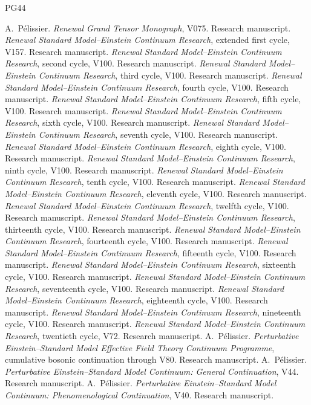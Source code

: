 \documentclass[11pt,a4paper,oneside]{book}
\theoremstyle{plain}
\theoremstyle{definition}
\theoremstyle{remark}
\begin{document}
\backmatter
\begingroup\small
\begin{thebibliography}{PG44}
\setlength{\itemsep}{0pt}
\setlength{\parsep}{0pt}
\setlength{\parskip}{0pt}
 A.\ P\'elissier. \emph{Renewal Grand Tensor Monograph}, V075. Research manuscript.
 \emph{Renewal Standard Model--Einstein Continuum Research}, extended first cycle, V157. Research manuscript.
 \emph{Renewal Standard Model--Einstein Continuum Research}, second cycle, V100. Research manuscript.
 \emph{Renewal Standard Model--Einstein Continuum Research}, third cycle, V100. Research manuscript.
 \emph{Renewal Standard Model--Einstein Continuum Research}, fourth cycle, V100. Research manuscript.
 \emph{Renewal Standard Model--Einstein Continuum Research}, fifth cycle, V100. Research manuscript.
 \emph{Renewal Standard Model--Einstein Continuum Research}, sixth cycle, V100. Research manuscript.
 \emph{Renewal Standard Model--Einstein Continuum Research}, seventh cycle, V100. Research manuscript.
 \emph{Renewal Standard Model--Einstein Continuum Research}, eighth cycle, V100. Research manuscript.
 \emph{Renewal Standard Model--Einstein Continuum Research}, ninth cycle, V100. Research manuscript.
 \emph{Renewal Standard Model--Einstein Continuum Research}, tenth cycle, V100. Research manuscript.
 \emph{Renewal Standard Model--Einstein Continuum Research}, eleventh cycle, V100. Research manuscript.
 \emph{Renewal Standard Model--Einstein Continuum Research}, twelfth cycle, V100. Research manuscript.
 \emph{Renewal Standard Model--Einstein Continuum Research}, thirteenth cycle, V100. Research manuscript.
 \emph{Renewal Standard Model--Einstein Continuum Research}, fourteenth cycle, V100. Research manuscript.
 \emph{Renewal Standard Model--Einstein Continuum Research}, fifteenth cycle, V100. Research manuscript.
 \emph{Renewal Standard Model--Einstein Continuum Research}, sixteenth cycle, V100. Research manuscript.
 \emph{Renewal Standard Model--Einstein Continuum Research}, seventeenth cycle, V100. Research manuscript.
 \emph{Renewal Standard Model--Einstein Continuum Research}, eighteenth cycle, V100. Research manuscript.
 \emph{Renewal Standard Model--Einstein Continuum Research}, nineteenth cycle, V100. Research manuscript.
 \emph{Renewal Standard Model--Einstein Continuum Research}, twentieth cycle, V72. Research manuscript.
 A.\ P\'elissier. \emph{Perturbative Einstein--Standard Model Effective Field Theory Continuum Programme}, cumulative bosonic continuation through V80. Research manuscript.
 A.\ P\'elissier. \emph{Perturbative Einstein--Standard Model Continuum: General Continuation}, V44. Research manuscript.
 A.\ P\'elissier. \emph{Perturbative Einstein--Standard Model Continuum: Phenomenological Continuation}, V40. Research manuscript.
\end{thebibliography}
\endgroup
\end{document}
